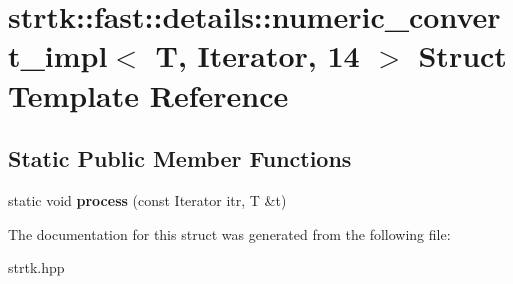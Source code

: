 \hypertarget{structstrtk_1_1fast_1_1details_1_1numeric__convert__impl_3_01T_00_01Iterator_00_0114_01_4}{\section{strtk\-:\-:fast\-:\-:details\-:\-:numeric\-\_\-convert\-\_\-impl$<$ T, Iterator, 14 $>$ Struct Template Reference}
\label{structstrtk_1_1fast_1_1details_1_1numeric__convert__impl_3_01T_00_01Iterator_00_0114_01_4}
}
\subsection*{Static Public Member Functions}
\begin{DoxyCompactItemize}
\item 
\hypertarget{structstrtk_1_1fast_1_1details_1_1numeric__convert__impl_3_01T_00_01Iterator_00_0114_01_4_a183ca9591f5d6a2492f225d8eed5fd38}{static void {\bfseries process} (const Iterator itr, T \&t)}\label{structstrtk_1_1fast_1_1details_1_1numeric__convert__impl_3_01T_00_01Iterator_00_0114_01_4_a183ca9591f5d6a2492f225d8eed5fd38}

\end{DoxyCompactItemize}


The documentation for this struct was generated from the following file\-:\begin{DoxyCompactItemize}
\item 
strtk.\-hpp\end{DoxyCompactItemize}
